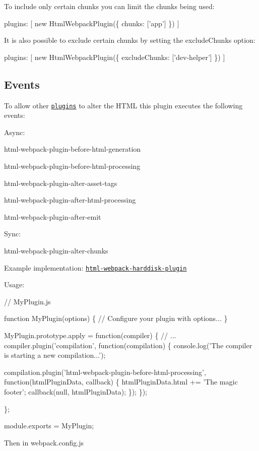 To include only certain chunks you can limit the chunks being used\+:


\begin{DoxyCode}
plugins: [
  new HtmlWebpackPlugin(\{
    chunks: ['app']
  \})
]
\end{DoxyCode}


It is also possible to exclude certain chunks by setting the {\ttfamily exclude\+Chunks} option\+:


\begin{DoxyCode}
plugins: [
  new HtmlWebpackPlugin(\{
    excludeChunks: ['dev-helper']
  \})
]
\end{DoxyCode}


\subsection*{Events }

To allow other \href{https://github.com/webpack/docs/wiki/plugins}{\tt plugins} to alter the H\+T\+ML this plugin executes the following events\+:

Async\+:


\begin{DoxyItemize}
\item {\ttfamily html-\/webpack-\/plugin-\/before-\/html-\/generation}
\item {\ttfamily html-\/webpack-\/plugin-\/before-\/html-\/processing}
\item {\ttfamily html-\/webpack-\/plugin-\/alter-\/asset-\/tags}
\item {\ttfamily html-\/webpack-\/plugin-\/after-\/html-\/processing}
\item {\ttfamily html-\/webpack-\/plugin-\/after-\/emit}
\end{DoxyItemize}

Sync\+:


\begin{DoxyItemize}
\item {\ttfamily html-\/webpack-\/plugin-\/alter-\/chunks}
\end{DoxyItemize}

Example implementation\+: \href{https://github.com/jantimon/html-webpack-harddisk-plugin}{\tt html-\/webpack-\/harddisk-\/plugin}

Usage\+:


\begin{DoxyCode}
// MyPlugin.js

function MyPlugin(options) \{
  // Configure your plugin with options...
\}

MyPlugin.prototype.apply = function(compiler) \{
  // ...
  compiler.plugin('compilation', function(compilation) \{
    console.log('The compiler is starting a new compilation...');

    compilation.plugin('html-webpack-plugin-before-html-processing', function(htmlPluginData, callback) \{
      htmlPluginData.html += 'The magic footer';
      callback(null, htmlPluginData);
    \});
  \});

\};

module.exports = MyPlugin;
\end{DoxyCode}
 Then in {\ttfamily webpack.\+config.\+js}


